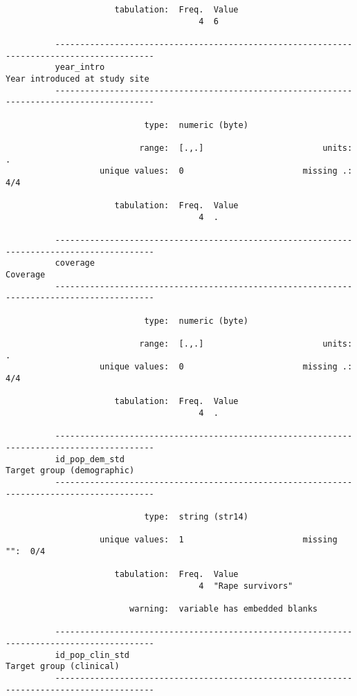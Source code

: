 \documentclass{article}
\begin{document}
\begin{verbatim}
                      tabulation:  Freq.  Value
                                       4  6
          
          ------------------------------------------------------------------------------------------
          year_intro                                                   Year introduced at study site
          ------------------------------------------------------------------------------------------
          
                            type:  numeric (byte)
          
                           range:  [.,.]                        units:  .
                   unique values:  0                        missing .:  4/4
          
                      tabulation:  Freq.  Value
                                       4  .
          
          ------------------------------------------------------------------------------------------
          coverage                                                                          Coverage
          ------------------------------------------------------------------------------------------
          
                            type:  numeric (byte)
          
                           range:  [.,.]                        units:  .
                   unique values:  0                        missing .:  4/4
          
                      tabulation:  Freq.  Value
                                       4  .
          
          ------------------------------------------------------------------------------------------
          id_pop_dem_std                                                  Target group (demographic)
          ------------------------------------------------------------------------------------------
          
                            type:  string (str14)
          
                   unique values:  1                        missing "":  0/4
          
                      tabulation:  Freq.  Value
                                       4  "Rape survivors"
          
                         warning:  variable has embedded blanks
          
          ------------------------------------------------------------------------------------------
          id_pop_clin_std                                                    Target group (clinical)
          ------------------------------------------------------------------------------------------
          

\end{verbatim}
\end{document}
